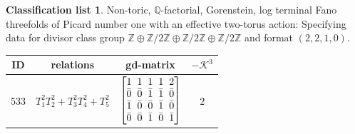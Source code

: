 \documentclass[10pt,a4paper]{amsart}
\theoremstyle{definition}
\newtheorem{class-list}[thm]{Classification list}
\def\ZZ{{\mathbb Z}}
\def\QQ{{\mathbb Q}}
\numberwithin{equation}{section}
\begin{document}
\begin{class-list}\label{class-list(0,2,2,2)}
Non-toric, $\QQ$-factorial, Gorenstein, log terminal Fano
threefolds of Picard number one with an effective two-torus action:
Specifying data for divisor class group
$\ZZ\oplus \ZZ/2\ZZ\oplus \ZZ/2\ZZ\oplus \ZZ/2\ZZ$ and
format $(2,2,1,0)$.
\begin{table}[h!]\centering\setlength{\tabcolsep}{5.5pt}
\renewcommand{\arraystretch}{1.15}\small\tabulinesep=1mm
\begin{tabu}{c|c|c|c}
\hline
ID&relations&gd-matrix&$-\mathcal{K}^3$
\\
\hline
${533}$&${T_{1}^{2}T_{2}^{2}+T_{3}^{2}T_{4}^{2}+T_{5}^{2}}$
&$\arraycolsep=1mm\begin{bmatrix}{1} & {1} & {1} & {1} & {2} \\ {\bar{0}} & {\bar{0}} & {\bar{1}} & {\bar{1}} & {\bar{0}} \\ {\bar{1}} & {\bar{0}} & {\bar{0}} & {\bar{1}} & {\bar{0}} \\ {\bar{0}} & {\bar{0}} & {\bar{1}} & {\bar{0}} & {\bar{1}}\end{bmatrix}$
&${2}$
\\
\hline
\end{tabu}%
\end{table}
\end{class-list}
\end{document}
